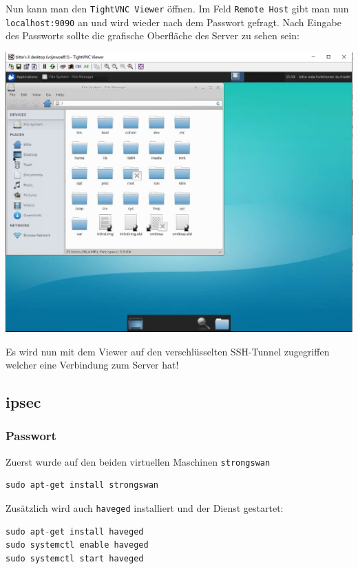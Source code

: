 Nun kann man den \verb|TightVNC Viewer| öffnen. Im Feld \verb|Remote Host| gibt man nun \verb|localhost:9090| an und wird wieder nach dem Passwort gefragt. Nach Eingabe des Passworts sollte die grafische Oberfläche des Server zu sehen sein:

\begin{minipage}{\linewidth}
	\centering
	\includegraphics[width=0.8\linewidth]{images/gui}
\end{minipage}

Es wird nun mit dem Viewer auf den verschlüsselten SSH-Tunnel zugegriffen welcher eine Verbindung zum Server hat!

\subsection{ipsec}
\subsubsection{Passwort}
Zuerst wurde auf den beiden virtuellen Maschinen \verb|strongswan|

\begin{lstlisting}[language=Java]
sudo apt-get install strongswan
\end{lstlisting}

Zusätzlich wird auch \verb|haveged| installiert und der Dienst gestartet:

\begin{lstlisting}[language=Java]
sudo apt-get install haveged
sudo systemctl enable haveged
sudo systemctl start haveged
\end{lstlisting}

